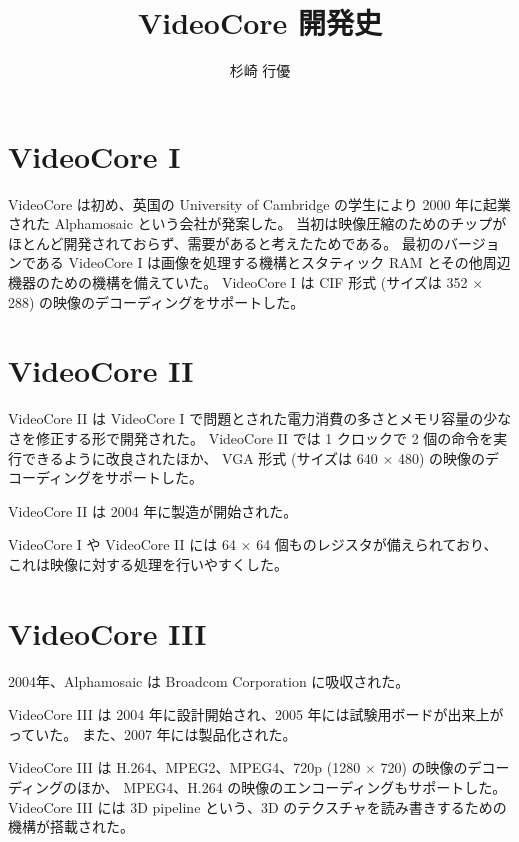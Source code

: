 \documentclass{jsarticle}
\title{VideoCore 開発史}
\author{杉崎 行優}
\date{}
\begin{document}
\maketitle
{}

\section{VideoCore I}
VideoCore は初め、英国の University of Cambridge の学生により
2000 年に起業された Alphamosaic という会社が発案した。
当初は映像圧縮のためのチップがほとんど開発されておらず、需要があると考えたためである。
最初のバージョンである VideoCore I は画像を処理する機構とスタティック RAM とその他周辺機器のための機構を備えていた。
VideoCore I は CIF 形式 (サイズは 352 $\times$ 288) の映像のデコーディングをサポートした。

\section{VideoCore II}
VideoCore II は VideoCore I で問題とされた電力消費の多さとメモリ容量の少なさを修正する形で開発された。
VideoCore II では 1 クロックで 2 個の命令を実行できるように改良されたほか、
VGA 形式 (サイズは 640 $\times$ 480) の映像のデコーディングをサポートした。

VideoCore II は 2004 年に製造が開始された。

VideoCore I や VideoCore II には 64 $\times$ 64 個ものレジスタが備えられており、
これは映像に対する処理を行いやすくした。

\section{VideoCore III}
2004年、Alphamosaic は Broadcom Corporation に吸収された。

VideoCore III は 2004 年に設計開始され、2005 年には試験用ボードが出来上がっていた。
また、2007 年には製品化された。

VideoCore III は H.264、MPEG2、MPEG4、720p (1280 $\times$ 720) の映像のデコーディングのほか、
MPEG4、H.264 の映像のエンコーディングもサポートした。
VideoCore III には 3D pipeline という、3D のテクスチャを読み書きするための機構が搭載された。
\end{document}
